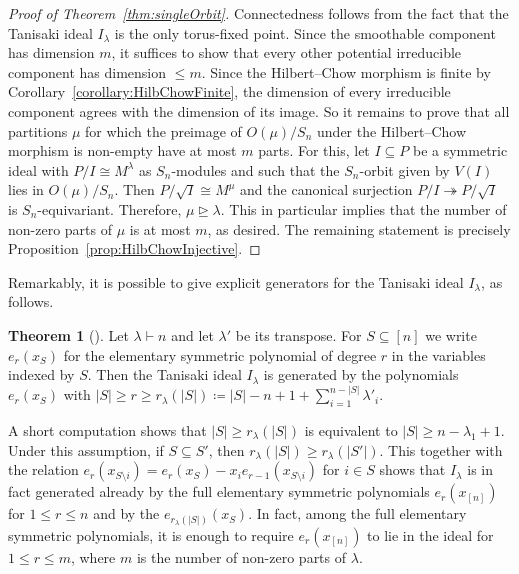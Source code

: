 \documentclass[11pt]{amsart}
\theoremstyle{definition}
\newtheorem{theorem}{Theorem}[section]
\begin{document}
\begin{proof}[Proof of Theorem~\ref{thm:singleOrbit}]
    Connectedness follows from the fact that the Tanisaki ideal $I_\lambda$ is the only torus-fixed point. Since the smoothable component has dimension $m$, it suffices to show that every other potential irreducible component has dimension $\leq m$. Since the Hilbert--Chow morphism is finite by Corollary~\ref{corollary:HilbChowFinite}, the dimension of every irreducible component agrees with the dimension of its image. So it remains to prove that all partitions $\mu$ for which the preimage of $O(\mu)/S_n$ under the Hilbert--Chow morphism is non-empty have at most $m$ parts. For this, let $I \subseteq P$ be a symmetric ideal with $P/I \cong M^\lambda$ as $S_n$-modules and such that the $S_n$-orbit given by $V(I)$ lies in $O(\mu)/S_n$. Then $P/\sqrt{I} \cong M^\mu$ and the canonical surjection $P/I \twoheadrightarrow P/\sqrt{I}$ is $S_n$-equivariant. Therefore, $\mu \trianglerighteq \lambda$. This in particular implies that the number of non-zero parts of $\mu$ is at most $m$, as desired.
    The remaining statement is precisely Proposition~\ref{prop:HilbChowInjective}.
\end{proof}

Remarkably, it is possible to give explicit generators for the Tanisaki ideal $I_\lambda$, as follows.

\begin{theorem}[\cite{Tanisaki1982Defining,GarsiaProcesi1992}]
    Let $\lambda \vdash n$ and let $\lambda'$ be its transpose. For $S \subseteq [n]$ we write $e_r(x_S)$ for the elementary symmetric polynomial of degree $r$ in the variables indexed by $S$. Then the Tanisaki ideal $I_\lambda$ is generated by the polynomials $e_r(x_S)$ with $|S| \geq r \geq r_\lambda(|S|) \coloneqq |S| - n + 1 + \sum_{i=1}^{n-|S|} \lambda'_i$.
\end{theorem}

A short computation shows that $|S| \geq r_\lambda(|S|)$ is equivalent to $|S| \geq n - \lambda_1 + 1$. Under this assumption, if $S \subseteq S'$, then $r_\lambda(|S|) \geq r_\lambda(|S'|)$. This together with the relation $e_r(x_{S \setminus i}) = e_r(x_S) - x_i e_{r-1}(x_{S \setminus i})$ for $i \in S$ shows that $I_\lambda$ is in fact generated already by the full elementary symmetric polynomials $e_r(x_{[n]})$ for $1 \leq r \leq n$ and by the $e_{r_\lambda(|S|)}(x_S)$. In fact, among the full elementary symmetric polynomials, it is enough to require $e_r(x_{[n]})$ to lie in the ideal for $1 \leq r \leq m$, where $m$ is the number of non-zero parts of $\lambda$.
\end{document}
